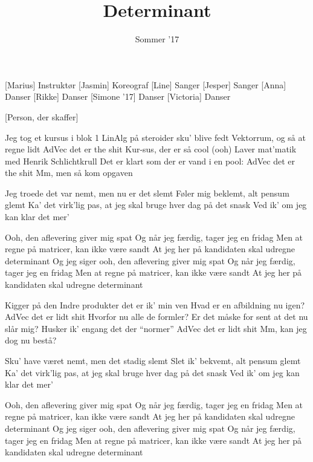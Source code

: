 \documentclass[a4paper,11pt]{article}
\title{Determinant}
\author{Sommer '17}
\begin{document}
\maketitle

\begin{roles}
[Marius] Instruktør
[Jasmin] Koreograf
[Line] Sanger
[Jesper] Sanger
[Anna] Danser
[Rikke] Danser
[Simone '17] Danser
[Victoria] Danser
\end{roles}

\begin{props}
[Person, der skaffer]
\end{props}


\begin{song}
%
Jeg tog et kursus i blok 1
LinAlg på steroider sku' blive fedt
Vektorrum, og så at regne lidt
AdVec det er the shit
Kur-sus, der er så cool (ooh)
Laver mat'matik med Henrik Schlichtkrull
Det er klart som der er vand i en pool:
AdVec det er the shit
Mm, men så kom opgaven

%
Jeg troede det var nemt, men nu er det slemt
Føler mig beklemt, alt pensum glemt
Ka' det virk'lig pas, at jeg skal bruge hver dag på det snask
Ved ik' om jeg kan klar det mer'

%
Ooh, den aflevering giver mig spat
Og når jeg færdig, tager jeg en fridag
Men at regne på matricer, kan ikke være sandt
At jeg her på kandidaten skal udregne determinant
Og jeg siger ooh, den aflevering giver mig spat
Og når jeg færdig, tager jeg en fridag
Men at regne på matricer, kan ikke være sandt
At jeg her på kandidaten skal udregne determinant

%
Kigger på den
Indre produkter det er ik' min ven
Hvad er en afbildning nu igen?
AdVec det er lidt shit
Hvorfor nu alle de formler?
Er det måske for sent at det nu slår mig?
Husker ik' engang det der ``normer''
AdVec det er lidt shit
Mm, kan jeg dog nu bestå?

%
Sku' have været nemt, men det stadig slemt
Slet ik' bekvemt, alt pensum glemt
Ka' det virk'lig pas, at jeg skal bruge hver dag på det snask
Ved ik' om jeg kan klar det mer'

%
Ooh, den aflevering giver mig spat
Og når jeg færdig, tager jeg en fridag
Men at regne på matricer, kan ikke være sandt
At jeg her på kandidaten skal udregne determinant
Og jeg siger ooh, den aflevering giver mig spat
Og når jeg færdig, tager jeg en fridag
Men at regne på matricer, kan ikke være sandt
At jeg her på kandidaten skal udregne determinant


\end{song}
\end{document}
